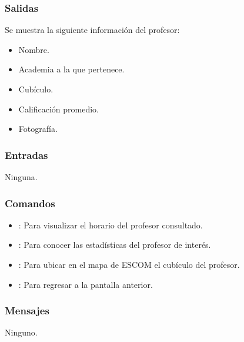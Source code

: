 \pagebreak
{}

\subsubsection{Salidas}
	\noindent
	Se muestra la siguiente información del profesor:
	\begin{itemize}
		\item Nombre.
		\item Academia a la que pertenece.
		\item Cubículo.
		\item Calificación promedio.
		\item Fotografía. 
	\end{itemize}

\subsubsection{Entradas}
	\noindent
	Ninguna.

\subsubsection{Comandos}
\begin{itemize}
	\item {}: Para visualizar el horario del profesor consultado.
	\item {}: Para conocer las estadísticas del profesor de interés. 
	\item {}: Para ubicar en el mapa de ESCOM el cubículo del profesor.
	\item {}: Para regresar a la pantalla anterior.
\end{itemize}

\subsubsection{Mensajes}
	\noindent
	Ninguno.

